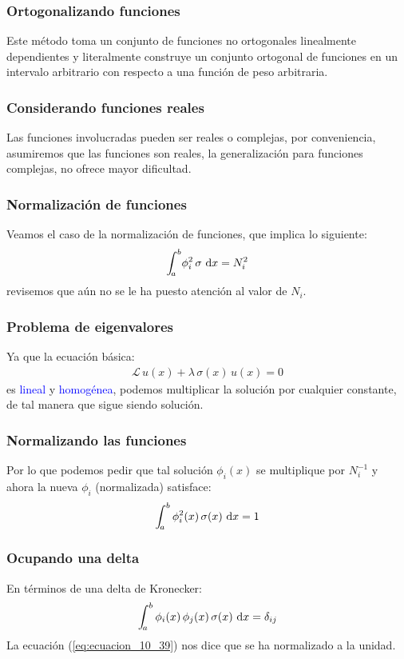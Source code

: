 \documentclass[12pt]{beamer}
\begin{document}
\begin{frame}
\frametitle{Ortogonalizando funciones}
Este método toma un conjunto de funciones no ortogonales linealmente dependientes y literalmente construye un conjunto ortogonal de funciones en un intervalo arbitrario con respecto a una función de peso arbitraria.
\end{frame}
\begin{frame}
\frametitle{Considerando funciones reales}
Las funciones involucradas pueden ser reales o complejas, por conveniencia, asumiremos que las funciones son reales, la generalización para funciones complejas, no ofrece mayor dificultad.
\end{frame}
\begin{frame}
\frametitle{Normalización de funciones}
Veamos el caso de la normalización de funciones, que implica lo siguiente:
\pause
\begin{align*}
\scaleint{5ex}_{\bs a}^{b} \phi_{i}^{2} \, \sigma  \, \dd{x}  =  N_{i}^{2}
\end{align*}
\pause
revisemos que aún no se le ha puesto atención al valor de $N_{i}$.
\end{frame}
\begin{frame}
\frametitle{Problema de eigenvalores}
Ya que la ecuación básica:
\pause
\begin{align}
\mathcal{L} \, u (x) + \lambda \, \sigma (x) \, u (x) = 0
\label{eq:ecuacion_10_08}
\end{align}
es \textcolor{blue}{lineal} y \textcolor{blue}{homogénea}, podemos multiplicar la solución por cualquier constante, de tal manera que sigue siendo solución.
\end{frame}
\begin{frame}
\frametitle{Normalizando las funciones}
Por lo que podemos pedir que tal solución $\phi_{i}(x)$ se multiplique por $N_{i}^{-1}$ \pause y ahora la nueva $\phi_{i}$ (normalizada) satisface:
\pause
\begin{align}
\scaleint{5ex}_{\bs a}^{b} \, \phi_{i}^{2} (x) \, \sigma(x) \, \dd{x} = 1
\label{eq:ecuacion_10_39}
\end{align}
\end{frame}
\begin{frame}
\frametitle{Ocupando una delta}
En términos de una delta de Kronecker:
\pause
\begin{align}
\scaleint{5ex}_{\bs a}^{b} \, \phi_{i}(x) \, \phi_{j} (x) \, \sigma (x) \, \dd{x} = \delta_{ij}
\label{eq:ecuacion_10_40}
\end{align}
\pause
La ecuación (\ref{eq:ecuacion_10_39}) nos dice que se ha normalizado a la unidad.
\end{frame}
\end{document}
